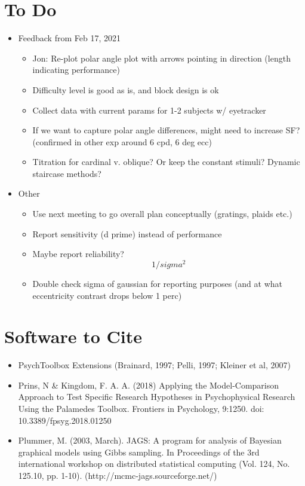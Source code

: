 \documentclass[11pt]{article} %
\begin{document}
\section{To Do} 
\begin{itemize}
\item Feedback from Feb 17, 2021
	\begin{itemize}
	\item Jon: Re-plot polar angle plot with arrows pointing in direction (length indicating performance)
	\item Difficulty level is good as is, and block design is ok
	\item Collect data with current params for 1-2 subjects w/ eyetracker
	\item If we want to capture polar angle differences, might need to increase SF? (confirmed in other exp around 6 cpd, 6 deg ecc)
	\item Titration for cardinal v. oblique? Or keep the constant stimuli? Dynamic staircase methods?
	\end{itemize}
\item Other
	\begin{itemize}
	\item Use next meeting to go overall plan conceptually (gratings, plaids etc.)
	\item Report sensitivity (d prime) instead of performance
	\item Maybe report reliability? \begin{equation}1/sigma^{2}\end{equation}
	\item Double check sigma of gaussian for reporting purposes (and at what eccentricity contrast drops below 1 perc)
	\end{itemize}
\end{itemize}

\section{Software to Cite}
\begin{itemize}
\item PsychToolbox Extensions (Brainard, 1997; Pelli, 1997; Kleiner et al, 2007)
\item Prins, N \& Kingdom, F. A. A. (2018) Applying the Model-Comparison Approach to Test Specific Research Hypotheses in Psychophysical Research Using the Palamedes Toolbox. Frontiers in Psychology, 9:1250. doi: 10.3389/fpsyg.2018.01250
\item Plummer, M. (2003, March). JAGS: A program for analysis of Bayesian graphical models using Gibbs sampling. In Proceedings of the 3rd international workshop on distributed statistical computing (Vol. 124, No. 125.10, pp. 1-10). (http://mcmc-jags.sourceforge.net/)
\end{itemize}
\end{document}
